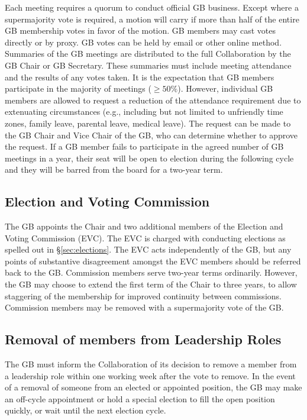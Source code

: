 \documentclass[12pt]{article}
\begin{document}
Each meeting requires a quorum to conduct official GB business. Except where a supermajority vote is required, a motion will carry if more than half of the entire GB membership votes in favor of the motion. GB members may cast votes directly or by proxy. GB votes can be held by email or other online method. Summaries of the GB meetings are distributed to the full Collaboration by the GB Chair or GB Secretary. These summaries must include meeting attendance and the results of any votes taken. It is the expectation that GB members participate in the majority of meetings ($\ge 50\%$). However, individual GB members are allowed to request a reduction of the attendance requirement due to extenuating circumstances (e.g., including but not limited to unfriendly time zones, family leave, parental leave, medical leave). The request can be made to the GB Chair and Vice Chair of the GB, who can determine whether to approve the request. If a GB member fails to participate in the agreed number of GB meetings in a year, their seat will be open to election during the following cycle and they will be barred from the board for a two-year term.


\subsection{Election and Voting Commission}

The GB appoints the Chair and two additional members of the Election and Voting Commission (EVC).  The EVC is charged with conducting elections as spelled out in \S\ref{sec:elections}. The EVC acts independently of the GB, but any points of substantive disagreement amongst the EVC members should be referred back to the GB.  Commission members serve two-year terms ordinarily.  However, the GB may choose to extend the first term of the Chair to  three years, to allow staggering of the membership for improved continuity between commissions.   Commission members may be removed with a supermajority vote of the GB.

 \subsection{Removal of members from Leadership Roles}

The GB must inform the Collaboration of its decision to remove a member from a leadership role within one working week after the vote to remove.  In the event of a removal of someone from an elected or appointed position, the GB may make an off-cycle appointment or hold a special election to fill the open position quickly, or wait until the next election cycle.
\end{document}
